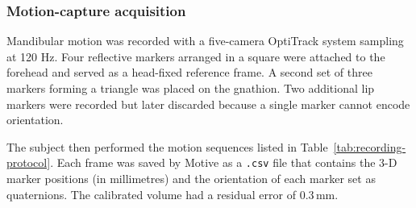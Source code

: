 \subsubsection{Motion-capture acquisition}
Mandibular motion was recorded with a five-camera OptiTrack system sampling at 120 Hz.
Four reflective markers arranged in a square were attached to the forehead and served as a head-fixed reference frame.
A second set of three markers forming a triangle was placed on the gnathion.
Two additional lip markers were recorded but later discarded because a single marker cannot encode orientation. \cite{motion_capture_adult,motion_capture_children}

The subject then performed the motion sequences listed in Table~\ref{tab:recording-protocol}. Each frame was saved by Motive as a \texttt{.csv} file that contains
the 3-D marker positions (in millimetres) and the orientation of each marker set as quaternions. The calibrated volume had a residual error of $0.3\,$mm.

